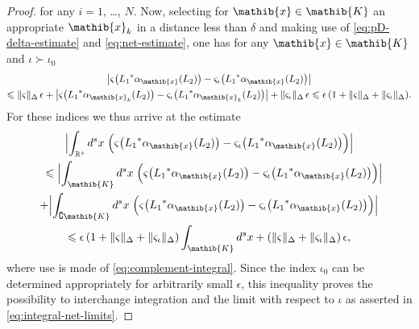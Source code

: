 \documentclass[a4paper,a4paper]{article}
\numberwithin{equation}{section}
\newcommand{\Kib}{\mathib{K}}
\newcommand{\xib}{\mathib{x}}
\newcommand{\Rs}{\mathbb{R}^s}
\newcommand{\aibx}{\alpha_\mathib{x}}
\theoremstyle{definition}
\theoremstyle{plain}
\theoremstyle{remark}
\newcommand{\babs}[1]{\bigl\lvert #1 \bigr\rvert}
\newcommand{\Babs}[1]{\Bigl\lvert #1 \Bigr\rvert}
\newcommand{\norm}[1]{\lVert #1 \rVert}
\begin{document}
\begin{proof}
    for any $i=1$, \dots, $N$. Now, selecting for $\xib \in \Kib$ an
    appropriate $\xib_k$ in a distance less than $\delta$ and making
    use of \eqref{eq:pD-delta-estimate} and \eqref{eq:net-estimate},
    one has for any $\xib \in \Kib$ and $\iota \succ \iota_0$
    \begin{multline*}
      \babs{\varsigma \bigl( {L_1}^* \aibx ( L_2 ) \bigr) -
      \varsigma_\iota \bigl( {L_1}^* \aibx ( L_2 ) \bigr)} \\
      \leqslant
      \norm{\varsigma}_\Delta \, \epsilon + \babs{\varsigma \bigl(
      {L_1}^* \alpha_{\xib_k} (L_2 ) \bigr) - \varsigma_\iota \bigl(
      {L_1}^* \alpha_{\xib_k} ( L_2 ) \bigr)} +
      \norm{\varsigma_\iota}_\Delta \, \epsilon
      \leqslant \epsilon \, ( 1 + \norm{\varsigma}_\Delta +
      \norm{\varsigma_\iota}_\Delta ) \text{.}
    \end{multline*} 
    For these indices we thus arrive at the estimate
    \begin{multline*}
      \Babs{\int_{\Rs} d^s x \; \Bigl( \varsigma \bigl( {L_1}^* \aibx
      ( L_2 ) \bigr) - \varsigma_\iota \bigl( {L_1}^* \aibx ( L_2 )
      \bigr) \Bigr)} \\
      \shoveleft{\leqslant \Babs{\int_\Kib d^s x \; \Bigl( \varsigma
      \bigl( {L_1}^* \aibx ( L_2 ) \bigr) - \varsigma_\iota \bigl(
      {L_1}^* \aibx ( L_2 ) \bigr) \Bigr)}} \\
      + \Babs{\int_{\complement \Kib} d^s x \; \Bigl(
      \varsigma \bigl( {L_1}^* \aibx ( L_2 ) \bigr) - \varsigma_\iota
      \bigl( {L_1}^* \aibx ( L_2 ) \bigr) \Bigr)} \\
      \leqslant \epsilon \, ( 1 + \norm{\varsigma}_\Delta +
      \norm{\varsigma_\iota}_\Delta ) \int_\Kib d^s x + (
      \norm{\varsigma}_\Delta + \norm{\varsigma_\iota}_\Delta ) \,
      \epsilon \text{,}
    \end{multline*}
    where use is made of \eqref{eq:complement-integral}. Since the
    index $\iota_0$ can be determined appropriately for arbitrarily
    small $\epsilon$, this inequality proves the possibility to
    interchange integration and the limit with respect to $\iota$ as
    asserted in \eqref{eq:integral-net-limits}.
  \end{proof}
\end{document}
